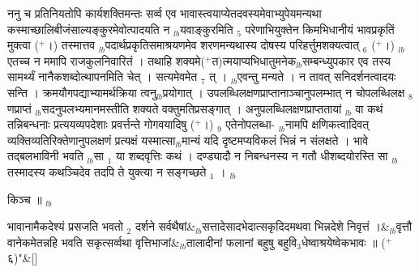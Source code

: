\documentclass[article,12pt,a4paper]{memoir}%
\newcommand{\add}[1]{($^{+}$#1)}
\newcounter{parCount}
\begin{document}
	  
	  \pstart \leavevmode%
	ननु च प्रतिनियतोपि कार्यशक्तिमन्तः सर्व्व एव भावास्त्वयाप्येतदवस्यमेवाभ्युपेयमन्यथा कस्माच्छालिबीजंसाल्यङ्कुरमेवोत्पादयति न {\tiny $_{lb}$}यवाङ्कुरमिति {\tiny $_{5}$} परेणाभियुक्तेन किमभिधानीयं भावप्रकृतिं मुक्त्वा \add{।} तस्मात्तव {\tiny $_{lb}$}पदार्थप्रकृतिसमाश्रयणमेव शरणमन्यथास्य दोषस्य परिहर्त्तुमशक्यत्वात् {\tiny $_{6}$} \add{।} {\tiny $_{lb}$}एतच्च न ममापि राजकुलनिवारितं । तथाहि शक्यमे\add{त}त्मयाप्यभिधातुमनेक{\tiny $_{lb}$}सम्बन्ध्युपकार एव तस्य सामर्थ्यं नानैकशब्दोत्थापनमिति चेत् । सत्यमेवमेत {\tiny $_{7}$} त् । {\tiny $_{lb}$}एवन्तु मन्यते । न तावत् सनिदर्शनत्वादयः सन्ति । क्रमयौगपद्याभ्यामर्थक्रिया त्वनु{\tiny $_{lb}$}प्रयोगात् । उपलब्धिलक्षणप्राप्तानाञ्चानुपलम्भात् न चोपलब्धिलक्ष {\tiny $_{8}$} णप्राप्तं {\tiny $_{lb}$}सदनुपलभ्यमानमस्तीति शक्यते वक्तुमतिप्रसङ्गात् । अनुपलब्धिलक्षणप्राप्ततायां {\tiny $_{lb}$} \leavevmode{} वा कथं तन्निबन्धनाः प्रत्ययव्यपदेशाः प्रवर्त्तन्ते गोगवयादिषु \add{।} {\tiny $_{9}$} \leavevmode{} एतेनोपलब्धा- {\tiny $_{lb}$}नामपि क्षणिकत्वादिवत् व्यक्तिव्यतिरिक्तेणानुपलक्षणं प्रत्यक्षं यस्मात्सा{\tiny $_{lb}$}मान्यं यदि दृष्टमप्यविकलं भिन्नं न संलक्षते । भावे तद्बलभाविनी भवति {\tiny $_{lb}$}सा {\tiny $_{1}$} या शब्दवृत्तिः कथं । दण्ड्यादौ न निबन्धनस्य न गतौ धीशब्दयोरस्ति सा {\tiny $_{lb}$}तस्मादस्य कथञ्चिदेव तदपि ते युक्त्या न सङ्गच्छते {\tiny $_{1}$} ।
	{}
	\pend%
      {\tiny $_{lb}$}

	  
	  \pstart \leavevmode%
	किञ्च ॥
	{}
	\pend%
      {\tiny $_{lb}$}
	  \bigskip
	  \begingroup
	
	    
	    \stanza[\smallbreak]
	  भावानामैकदेश्यं प्रसजति भवतो {\tiny $_{2}$} दर्शने सर्वथैषां&{\tiny $_{lb}$}सत्तादेसादभेदात्सकृदिदमथवा भिन्नदेशे निवृत्तं ।&{\tiny $_{lb}$}वृत्तौ वानेकमेतन्नहि भवति सकृत्सर्व्वथा वृत्तिभाजां&{\tiny $_{lb}$}तालादीनां फलानां बहुषु बहुवि{\tiny $_{3}$}धेष्वाश्रयेष्वेकभावः ॥ \add{६}{\normalfontlatin\large\qquad{}"}\&[\smallbreak]
	  
	  
	  
\end{document}

